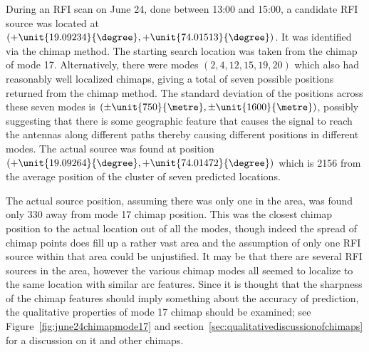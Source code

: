 \documentclass[a4paper,12pt]{article}
\begin{document}
                                                                                                                                                                                                                                                                                                                                                            During an RFI scan on June 24, done between 13:00 and 15:00, a candidate RFI source was located at $(+\unit{19.09234}{\degree},+\unit{74.01513}{\degree})$. It was identified via the chimap method. 
                                                                                                                                                                                                                                                                                                                                                                                The starting search location was taken from the chimap of mode 17. Alternatively, there were modes $(2,4,12,15,19,20)$ which also had reasonably well localized chimaps, giving a total of seven possible positions returned from the chimap method. The standard deviation of the positions across these seven modes is $(\pm\unit{750}{\metre},\pm\unit{1600}{\metre})$, possibly suggesting that there is some geographic feature that causes the signal to reach the antennas along different paths thereby causing different positions in different modes. The actual source was found at position $(+\unit{19.09264}{\degree},+\unit{74.01472}{\degree})$ which is \unit{2156}{\metre} from the average position of the cluster of seven predicted locations. 

                                                                                                                                                                                                                                                                                                                                                                                                    The actual source position, assuming there was only one in the area, was found only \unit{330}{\metre} away from mode 17 chimap position. This was the closest chimap position to the actual location out of all the modes, though indeed the spread of chimap points does fill up a rather vast area and the assumption of only one RFI source within that area could be unjustified. It may be that there are several RFI sources in the area, however the various chimap modes all seemed to localize to the same location with similar arc features. Since it is thought that the sharpness of the chimap features should imply something about the accuracy of prediction, the qualitative properties of mode 17 chimap should be examined; see Figure~\ref{fig:june24chimapmode17} and section~\ref{sec:qualitativediscussionofchimaps} for a discussion on it and other chimaps.
\end{document}

